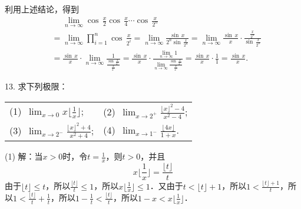 利用上述结论，得到
\begin{align}
    &\mathrel{\phantom{=}} \lim_{n \to \infty} \cos \, \frac{x}{2} \cos \, \frac{x}{4} \cdots \cos \, \frac{x}{2^n} \\
    &= \lim_{n \to \infty} \prod_{i=1}^n \cos \, \frac{x}{2^i} = \lim_{n \to \infty} \frac{\sin \, x}{2^{n} \sin \, \displaystyle\frac{x}{2^n}} = \lim_{n \to \infty} \frac{\sin \, x}{x} \cdot \frac{\displaystyle\frac{x}{2^n}}{\sin \, \displaystyle\frac{x}{2^n}} \\
    &= \frac{\sin \, x}{x} \cdot \lim_{n \to \infty} \displaystyle \frac{1}{\displaystyle\frac{\sin \, \displaystyle\frac{x}{2^n}}{\displaystyle\frac{x}{2^n}}} = \frac{\sin \, x}{x} \cdot \frac{\displaystyle\lim_{n \to \infty} 1}{\displaystyle\lim_{n \to \infty} \displaystyle\frac{\sin \, \displaystyle\frac{x}{2^n}}{\displaystyle\frac{x}{2^n}}} = \displaystyle\frac{\sin \, x}{x} \cdot \displaystyle\frac{1}{1} = \frac{\sin \, x}{x}.
\end{align}

13. 求下列极限：
\begin{table}[H]
    \centering
    \begin{tabularx}{\textwidth} {  >{\raggedright\arraybackslash}X >{\raggedright\arraybackslash}X  }
       (1)~$\displaystyle\lim_{x \to 0} x \bigg\lfloor \displaystyle \frac{1}{x} \bigg\rfloor$; & (2)~$\displaystyle \lim_{x \to 2^+} \displaystyle\frac{\lfloor x \rfloor^2 - 4}{x^2 - 4}$; \\ [1em]
       (3)~$\displaystyle\lim_{x \to 2^-} \displaystyle\frac{\lfloor x \rfloor^2 + 4}{x^2 + 4}$; & (4)~$\displaystyle\lim_{x \to 1^-} \displaystyle\frac{\lfloor 4x \rfloor}{1+x}$.
    \end{tabularx}
\end{table}

(1) 解：当$x > 0$时，令$t = \displaystyle\frac{1}{x}$，则$t > 0$，并且
\begin{equation}
    x \bigg \lfloor \frac{1}{x} \bigg\rfloor = \frac{\lfloor t \rfloor}{t}
\end{equation}
由于$\lfloor t \rfloor \leq t$，所以$\displaystyle\frac{\lfloor t \rfloor}{t} \leq 1$，所以$x \bigg\lfloor \displaystyle\frac{1}{x} \bigg\rfloor \leq 1$．又由于$t < \lfloor t \rfloor + 1$，所以$1 < \displaystyle\frac{\lfloor t \rfloor + 1}{t}$，所以$1 < \displaystyle\frac{\lfloor t \rfloor}{t} + \displaystyle\frac{1}{t}$，所以$1 - \displaystyle\frac{1}{t} < \displaystyle\frac{\lfloor t \rfloor}{t}$，所以$1-x < x \bigg \lfloor \displaystyle\frac{1}{x} \bigg\rfloor$．

